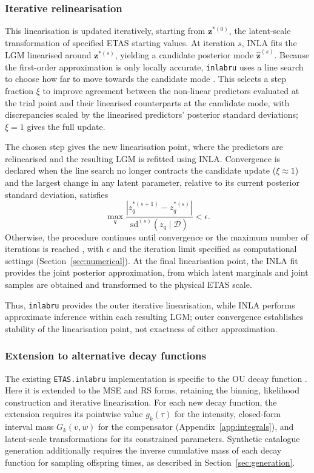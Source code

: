 \documentclass{statsmsc}
\begin{document}
\subsubsection{Iterative relinearisation} \label{sec:relin}
This linearisation is updated iteratively, starting from $\boldsymbol{z}^{\ast(0)}$, the latent-scale transformation of specified ETAS starting values. At iteration $s$, INLA fits the LGM linearised around ${\boldsymbol{z}}^{\ast (s)}$, yielding a candidate posterior mode $\widehat{\boldsymbol{z}}^{(s)}$. Because the first-order approximation is only locally accurate, \texttt{inlabru} uses a line search to choose how far to move towards the candidate mode \citep{lindgren2024inlabru}. This selects a step fraction $\xi$ to improve agreement between the non-linear predictors evaluated at the trial point and their linearised counterparts at the candidate mode, with discrepancies scaled by the linearised predictors' posterior standard deviations; $\xi = 1$ gives the full update. 

The chosen step gives the new linearisation point, where the predictors are relinearised and the resulting LGM is refitted using INLA. Convergence is declared when the line search no longer contracts the candidate update ($\xi \approx 1$) and the largest change in any latent parameter, relative to its current posterior standard deviation, satisfies
\begin{equation} \label{eq:convergence}
  \max_q \frac{|z_q^{\ast(s+1)}-z_q^{\ast(s)}|}{\mathrm{sd}^{(s)}(z_q \mid \mathcal{D})} < \epsilon.
\end{equation}
Otherwise, the procedure continues until convergence or the maximum number of iterations is reached \citep{lindgren2024inlabru}, with $\epsilon$ and the iteration limit specified as computational settings (Section~\ref{sec:numerical}). At the final linearisation point, the INLA fit provides the joint posterior approximation, from which latent marginals and joint samples are obtained and transformed to the physical ETAS scale. 

Thus, \texttt{inlabru} provides the outer iterative linearisation, while INLA performs approximate inference within each resulting LGM; outer convergence establishes stability of the linearisation point, not exactness of either approximation. 

\subsubsection{Extension to alternative decay functions} \label{sec:extension}
The existing \texttt{ETAS.inlabru} implementation is specific to the OU decay function \citep{naylor2023bayesian}. Here it is extended to the MSE and RS forms, retaining the binning, likelihood construction and iterative linearisation. For each new decay function, the extension requires its pointwise value $g_k(\tau)$ for the intensity, closed-form interval mass $G_k(v,w)$ for the compensator (Appendix~\ref{app:integrals}), and latent-scale transformations for its constrained parameters. Synthetic catalogue generation additionally requires the inverse cumulative mass of each decay function for sampling offspring times, as described in Section~\ref{sec:generation}.
\end{document}
